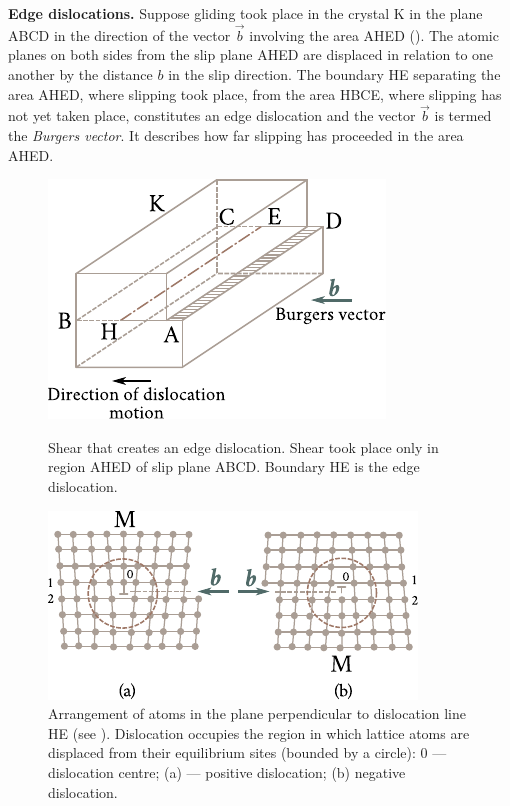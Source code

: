 \textbf{Edge dislocations.} Suppose gliding took place in the crystal K in the plane ABCD in the direction of the vector $\vec{b}$ involving the area AHED (). The atomic planes on both sides from the slip plane AHED are displaced in relation to one another by the distance $b$ in the slip direction. The boundary HE separating the area AHED, where slipping took place, from the area HBCE, where slipping has not yet taken place, constitutes an edge dislocation and the vector $\vec{b}$ is termed the \textit{Burgers vector}. It describes how far slipping has proceeded in the area AHED.

\begin{figure}[t]
	\begin{minipage}[t]{0.45\linewidth}
		\begin{center}
			\includegraphics[scale=0.9]{figures/ch_02/fig_2_9.pdf}
			\caption[]{Shear that creates an edge dislocation. Shear took place only in region AHED of slip plane ABCD. Boundary HE is the edge dislocation.}
			\label{fig:2_9}
		\end{center}
	\end{minipage}
	\hfill{ }%
	\begin{minipage}[t]{0.51\linewidth}
		\begin{center}
			\includegraphics[scale=0.95]{figures/ch_02/fig_2_10.pdf}
			\caption[]{Arrangement of atoms in the plane perpendicular to dislocation line HE (see ). Dislocation occupies the region in which lattice atoms are displaced from their equilibrium sites (bounded by a circle): $0$ --- dislocation centre; (a) --- positive dislocation; (b) negative dislocation.}
			\label{fig:2_10}
		\end{center}
	\end{minipage}
\vspace{-0.3cm}
\end{figure}

